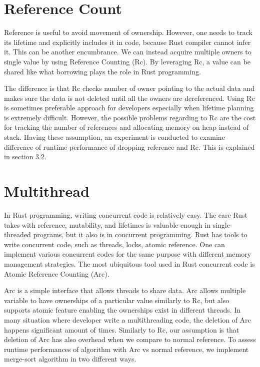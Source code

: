 \section{Reference Count}
\label{sec:concept_refcount}
Reference is useful to avoid movement of ownership. However, one needs to track its lifetime and explicitly includes it in code, 
because Rust compiler cannot infer it. This can be another encumbrance. We can instead acquire multiple owners to single value by using Reference Counting (Rc). 
By leveraging Rc, a value can be shared like what borrowing plays the role in Rust programming. 

The difference is that Rc checks number of owner pointing to the actual data and makes sure the data is not deleted 
until all the owners are dereferenced. Using Rc is sometimes preferable approach for developers especially when lifetime planning is extremely difficult.
However, the possible problems regarding to Rc are the cost for tracking the number of references and allocating memory on heap instead of stack.
Having these assumption, an experiment is conducted to examine difference of runtime performance of dropping reference and Rc. 
This is explained in section 3.2.

\section{Multithread}
\label{sec:concenpt_multithreading}
In Rust programming, writing concurrent code is relatively easy. The care Rust takes with reference, mutability, and lifetimes is valuable enough in single-threaded programs, 
but it also is in concurrent programming. Rust has tools to write concurrent code, such as threads, locks, atomic reference. 
One can implement various concurrent codes for the same purpose with different memory management strategies. 
The most ubiquitous tool used in Rust concurrent code is Atomic Reference Counting (Arc). 

Arc is a simple interface that allows threads to share data. Arc allows multiple variable to have ownerships of a particular value similarly to Rc, 
but also supports atomic feature enabling the ownerships exist in different threads. 
In many situation where developer write a multithreading code, the deletion of Arc happens significant amount of times. 
Similarly to Rc, our assumption is that deletion of Arc has also overhead when we compare to normal reference. 
To assess runtime performances of algorithm with Arc vs normal reference, we implement merge-sort algorithm in two different ways. 

